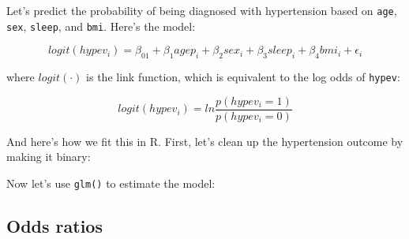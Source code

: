 \documentclass[
]{book}
\newenvironment{Shaded}{\begin{snugshade}}{\end{snugshade}}
\newcommand{\CommentTok}[1]{\textcolor[rgb]{0.56,0.35,0.01}{\textit{#1}}}
\newcommand{\DataTypeTok}[1]{\textcolor[rgb]{0.13,0.29,0.53}{#1}}
\newcommand{\DecValTok}[1]{\textcolor[rgb]{0.00,0.00,0.81}{#1}}
\newcommand{\KeywordTok}[1]{\textcolor[rgb]{0.13,0.29,0.53}{\textbf{#1}}}
\newcommand{\NormalTok}[1]{#1}
\newcommand{\OperatorTok}[1]{\textcolor[rgb]{0.81,0.36,0.00}{\textbf{#1}}}
\newcommand{\StringTok}[1]{\textcolor[rgb]{0.31,0.60,0.02}{#1}}
\begin{document}
Let's predict the probability of being diagnosed with hypertension based on \texttt{age}, \texttt{sex}, \texttt{sleep}, and \texttt{bmi}.
Here's the model:

\[
logit(hypev_i) = \beta_01 + \beta_1agep_i + \beta_2sex_i + \beta_3sleep_i + \beta_4bmi_i + \epsilon_i 
\]

where \(logit(\cdot)\) is the link function, which is equivalent to the log odds of \texttt{hypev}:

\[
logit(hypev_i) = ln \frac{p(hypev_i = 1)}{p(hypev_i = 0)}
\]

And here's how we fit this in R. First, let's clean up the hypertension outcome by making it binary:

\begin{Shaded}
\end{Shaded}

Now let's use \texttt{glm()} to estimate the model:

\begin{Shaded}
\end{Shaded}

\hypertarget{odds-ratios}{%
\subsection{Odds ratios}\label{odds-ratios}}
\end{document}
